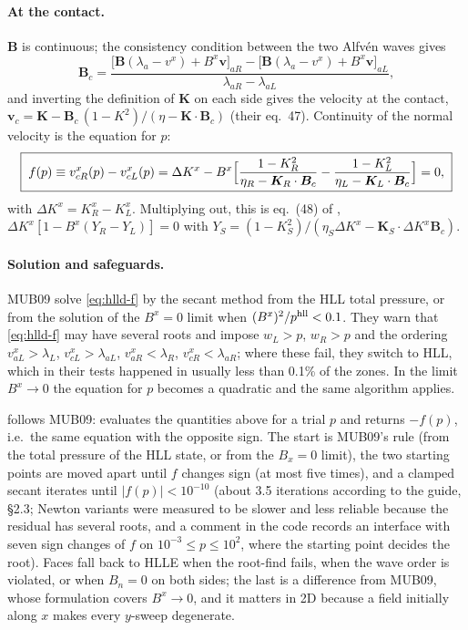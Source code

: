 \documentclass[11pt,a4paper,oneside,openany]{book}
\newcommand{\textcite}{\citet}
\theoremstyle{definition}
\theoremstyle{plain}
\theoremstyle{remark}
\newcommand{\vv}{\bm{v}}
\newcommand{\BB}{\bm{B}}
\newcommand{\code}[1]{\texttt{\detokenize{#1}}}
\newcommand{\file}[1]{\texttt{\detokenize{#1}}}
\begin{document}
\paragraph{At the contact.} $\BB$ is continuous; the consistency condition between the two
Alfvén waves gives
\begin{equation}
\BB_c=\frac{\bigl[\BB(\lambda_a-v^x)+B^x\vv\bigr]_{aR}-\bigl[\BB(\lambda_a-v^x)+B^x\vv\bigr]_{aL}}
{\lambda_{aR}-\lambda_{aL}},
\end{equation}
and inverting the definition of $\bm K$ on each side gives the velocity at the contact,
$\vv_c=\bm K-\BB_c\,(1-K^2)/(\eta-\bm K\cdot\BB_c)$ (their eq.~47). Continuity of the
normal velocity is the equation for $p$:
\begin{equation}\label{eq:hlld-f}
\boxed{\;f(p)\equiv v^x_{cR}(p)-v^x_{cL}(p)
=\Delta K^x-B^x\Bigl[\frac{1-K_R^2}{\eta_R-\bm K_R\cdot\BB_c}-\frac{1-K_L^2}{\eta_L-\bm K_L\cdot\BB_c}\Bigr]=0,\;}
\end{equation}
with $\Delta K^x=K^x_R-K^x_L$. Multiplying out, this is eq.~(48) of
\textcite{MignoneUglianoBodo2009}, $\Delta K^x[1-B^x(Y_R-Y_L)]=0$ with
$Y_S=(1-K_S^2)/(\eta_S\Delta K^x-\bm K_S\cdot\Delta K^x\BB_c)$.

\paragraph{Solution and safeguards.} MUB09 solve \eqref{eq:hlld-f} by the secant method from
the HLL total pressure, or from the solution of the $B^x=0$ limit when
$(B^x)^2/p^{\rm hll}<0.1$. They warn that \eqref{eq:hlld-f} may have several roots and impose
$w_L>p$, $w_R>p$ and the ordering $v^x_{aL}>\lambda_L$, $v^x_{cL}>\lambda_{aL}$,
$v^x_{aR}<\lambda_R$, $v^x_{cR}<\lambda_{aR}$; where these fail, they switch to HLL, which in
their tests happened in usually less than 0.1\% of the zones. In the limit $B^x\to0$ the
equation for $p$ becomes a quadratic and the same algorithm applies.

\begin{codebox}[: HLLD]
\file{HLLD/src/physics/hlld.py} follows MUB09: \code{HLLDComputation} evaluates the
quantities above for a trial $p$ and returns $-f(p)$, i.e.\ the same equation with the
opposite sign. The start is MUB09's rule (from the total pressure of the HLL state, or from
the $B_x=0$ limit), the two starting points are moved apart until $f$ changes sign (at most
five times), and a clamped secant iterates until $|f(p)|<10^{-10}$ (about 3.5 iterations
according to the guide, \S2.3; Newton variants were measured to be slower and less reliable
because the residual has several roots, and a comment in the code records an interface with
seven sign changes of $f$ on $10^{-3}\le p\le10^2$, where the starting point decides the root). Faces fall back to HLLE when the root-find fails, when the wave order is violated, or
when $B_n=0$ on both sides; the last is a difference from MUB09, whose formulation covers
$B^x\to0$, and it matters in 2D because a field initially along $x$ makes every $y$-sweep
degenerate.
\end{codebox}
\end{document}
